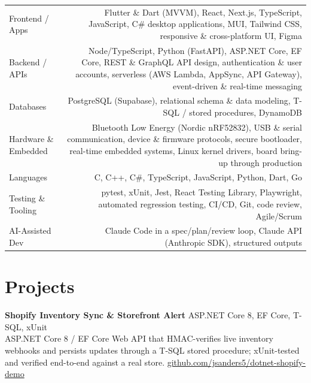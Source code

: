 \documentclass[10.5pt, letterpaper]{article}
\begin{document}
\begin{tabularx}{\linewidth}{@{}LR@{}}
  Frontend / Apps      & Flutter \& Dart (MVVM), React, Next.js, TypeScript,
                         JavaScript, C\# desktop applications, MUI, Tailwind CSS,
                         responsive \& cross-platform UI, Figma \\[3pt]
  Backend / APIs       & Node/TypeScript, Python (FastAPI), ASP.NET Core, EF Core,
                         REST \& GraphQL API design, authentication \& user
                         accounts, serverless (AWS Lambda, AppSync, API Gateway),
                         event-driven \& real-time messaging \\[3pt]
  Databases            & PostgreSQL (Supabase), relational schema \& data modeling,
                         T-SQL / stored procedures, DynamoDB \\[3pt]
  Hardware \& Embedded & Bluetooth Low Energy (Nordic nRF52832), USB \& serial
                         communication, device \& firmware protocols, secure
                         bootloader, real-time embedded systems, Linux kernel
                         drivers, board bring-up through production \\[3pt]
  Languages            & C, C++, C\#, TypeScript, JavaScript, Python, Dart, Go \\[3pt]
  Testing \& Tooling   & pytest, xUnit, Jest, React Testing Library, Playwright,
                         automated regression testing, CI/CD, Git, code review,
                         Agile/Scrum \\[3pt]
  AI-Assisted Dev      & Claude Code in a spec/plan/review loop, Claude API
                         (Anthropic SDK), structured outputs \\[3pt]
\end{tabularx}

\section{Projects}

\noindent\textbf{Shopify Inventory Sync \& Storefront Alert}
\hfill\textcolor{muted}{\small ASP.NET Core 8, EF Core, T-SQL, xUnit}\\
ASP.NET Core 8 / EF Core Web API that HMAC-verifies live inventory webhooks and
persists updates through a T-SQL stored procedure; xUnit-tested and verified
end-to-end against a real store.
\hfill\textcolor{muted}{\small\href{https://github.com/jsanders5/dotnet-shopify-demo}{github.com/jsanders5/dotnet-shopify-demo}}
\end{document}
